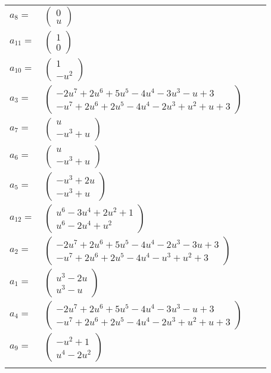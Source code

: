 \documentclass[1p]{elsarticle_modified}
\theoremstyle{definition}
\begin{document}
\begin{tabular}{m{7pt} m{180pt} m{7pt} m{180pt} }
\flushright $a_{8}=$&$\begin{pmatrix}0\\u\end{pmatrix}$ \\
\flushright $a_{11}=$&$\begin{pmatrix}1\\0\end{pmatrix}$ \\
\flushright $a_{10}=$&$\begin{pmatrix}1\\- u^2\end{pmatrix}$ \\
\flushright $a_{3}=$&$\begin{pmatrix}-2 u^7+2 u^6+5 u^5-4 u^4-3 u^3- u+3\\- u^7+2 u^6+2 u^5-4 u^4-2 u^3+u^2+u+3\end{pmatrix}$ \\
\flushright $a_{7}=$&$\begin{pmatrix}u\\- u^3+u\end{pmatrix}$ \\
\flushright $a_{6}=$&$\begin{pmatrix}u\\- u^3+u\end{pmatrix}$ \\
\flushright $a_{5}=$&$\begin{pmatrix}- u^3+2 u\\- u^3+u\end{pmatrix}$ \\
\flushright $a_{12}=$&$\begin{pmatrix}u^6-3 u^4+2 u^2+1\\u^6-2 u^4+u^2\end{pmatrix}$ \\
\flushright $a_{2}=$&$\begin{pmatrix}-2 u^7+2 u^6+5 u^5-4 u^4-2 u^3-3 u+3\\- u^7+2 u^6+2 u^5-4 u^4- u^3+u^2+3\end{pmatrix}$ \\
\flushright $a_{1}=$&$\begin{pmatrix}u^3-2 u\\u^3- u\end{pmatrix}$ \\
\flushright $a_{4}=$&$\begin{pmatrix}-2 u^7+2 u^6+5 u^5-4 u^4-3 u^3- u+3\\- u^7+2 u^6+2 u^5-4 u^4-2 u^3+u^2+u+3\end{pmatrix}$ \\
\flushright $a_{9}=$&$\begin{pmatrix}- u^2+1\\u^4-2 u^2\end{pmatrix}$\\&\end{tabular}
\end{document}
